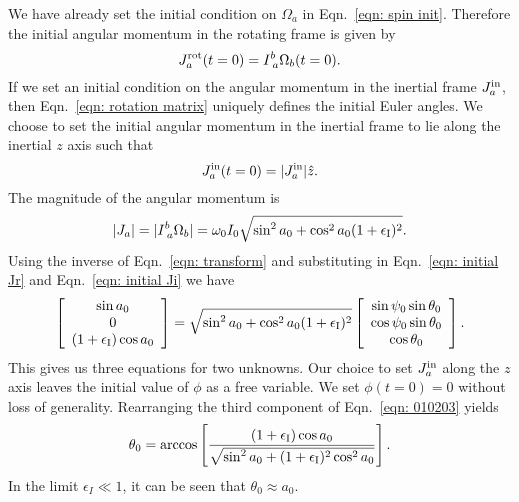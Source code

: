 \documentclass[../full_thesis/full_thesis.tex]{subfiles}
\begin{document}
We have already set the initial condition on $\Omega_a$ in Eqn.~\eqref{eqn:
spin init}. Therefore the initial angular momentum in the rotating frame is given by
\begin{equation}
  J^{\textrm{rot}}_a(t=0) = I^{b}_{\; a} \Omega_b(t=0).
\label{eqn: initial Jr}
\end{equation}
If we set an initial condition on the angular momentum in the inertial frame
$J^{\textrm{in}}_a$, then Eqn.~\eqref{eqn: rotation matrix} uniquely defines the initial
Euler angles. We choose to set the initial angular momentum in the inertial
frame to lie along the inertial $z$ axis such that
\begin{equation}
  J^{\textrm{in}}_a(t=0) = |J^{\textrm{in}}_a| \hat{z}.
\label{eqn: initial Ji}
\end{equation}
The magnitude of the angular momentum is
\begin{equation}
|J_a| = |I^{b}_{\; a} \Omega_{b}|=\omega_{0}I_{0}\sqrt{\sin^{2}a_{0} + \cos^{2}a_{0}(1+\epsilon_{\mathrm{I}})^2}.
\end{equation}
Using the inverse of Eqn.~\eqref{eqn: transform} and substituting in
Eqn.~\eqref{eqn: initial Jr} and Eqn.~\eqref{eqn: initial Ji} we have
\begin{equation}
\left[ \begin{array}{c}
\sin a_{0} \\
0 \\
(1+\epsilon_{\mathrm{I}})\cos a_{0}
\end{array}\right] =
\sqrt{\sin^{2} a_{0} + \cos^{2}a_{0}(1+\epsilon_{\mathrm{I}})^{2}}
\left[ \begin{array}{c}
\sin \psi_{0} \sin \theta_{0} \\
\cos \psi_{0} \sin \theta_{0} \\
\cos \theta_{0}
\end{array}\right].
\label{eqn: 010203}
\end{equation}
This gives us three equations for two unknowns. Our choice to set $J^{\textrm{in}}_a$ along
the $z$ axis leaves the initial value of $\phi$ as a free variable.
We set $\phi(t=0) = 0$ without loss of generality.
Rearranging the third component of Eqn.~\eqref{eqn: 010203} yields
\begin{equation}
\theta_{0} = \arccos\left[\frac{(1+\epsilon_{\mathrm{I}})\cos a_{0}}{ \sqrt{\sin^{2}
        a_{0} + (1+\epsilon_{\mathrm{I}})^{2}\cos^{2} a_{0}}} \right].
\label{eqn: theta init}
\end{equation}
In the limit $\epsilon_{I} \ll 1$, it can be seen that $\theta_{0} \approx a_{0}$.
\end{document}
